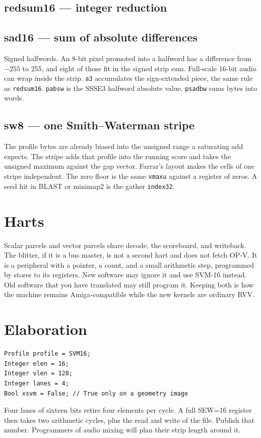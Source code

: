 

\subsection{redsum16 --- integer reduction}


\subsection{sad16 --- sum of absolute differences}

Signed halfwords. An 8-bit pixel promoted into a halfword has a difference from $-255$ to $255$, and eight of those fit in the signed strip sum. Full-scale 16-bit audio can wrap inside the strip. \texttt{a3} accumulates the sign-extended piece, the same rule as \texttt{redsum16}. \texttt{pabsw} is the SSSE3 halfword absolute value. \texttt{psadbw} sums bytes into words.



\subsection{sw8 --- one Smith--Waterman stripe}

The profile bytes are already biased into the unsigned range a saturating add expects. The stripe adds that profile into the running score and takes the unsigned maximum against the gap vector. Farrar's layout makes the cells of one stripe independent. The zero floor is the same \texttt{vmaxu} against a register of zeros. A seed hit in BLAST or minimap2 is the gather \texttt{index32}.



\section{Harts}

Scalar parcels and vector parcels share decode, the scoreboard, and writeback. The blitter, if it is a bus master, is not a second hart and does not fetch OP-V. It is a peripheral with a pointer, a count, and a small arithmetic step, programmed by stores to its registers. New software may ignore it and use SVM-16 instead. Old software that you have translated may still program it. Keeping both is how the machine remains Amiga-compatible while the new kernels are ordinary RVV.

\section{Elaboration}

\begin{lstlisting}
Profile profile = SVM16;
Integer elen = 16;
Integer vlen = 128;
Integer lanes = 4;
Bool xsvm = False; // True only on a geometry image
\end{lstlisting}

Four lanes of sixteen bits retire four elements per cycle. A full SEW=16 register then takes two arithmetic cycles, plus the read and write of the file. Publish that number. Programmers of audio mixing will plan their strip length around it.
